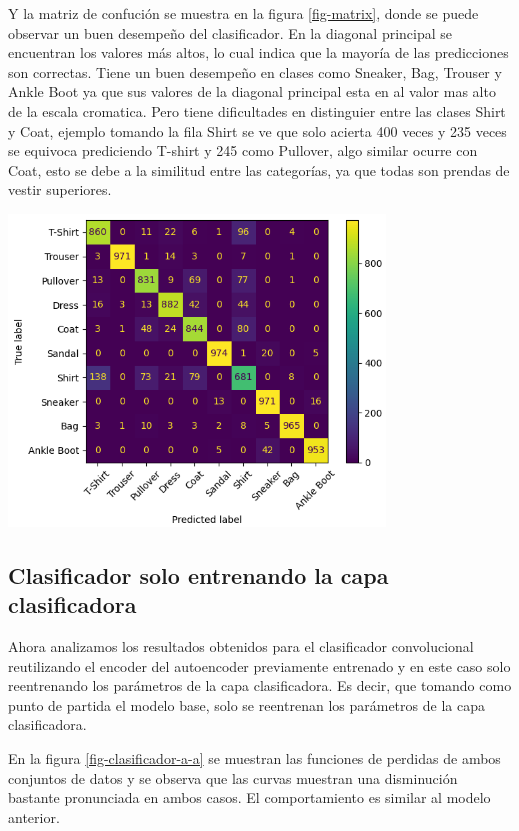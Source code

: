 \documentclass[aps,prl,reprint,groupedaddress]{revtex4-2}
\newenvironment{Figura}
  {\par\medskip\noindent\minipage{\linewidth}}
  {\endminipage\par\medskip}
\begin{document}
Y la matriz de confución se muestra en la figura \ref{fig-matrix}, donde se 
puede observar un buen desempeño del clasificador. En la diagonal principal se
encuentran los valores más altos, lo cual indica que la mayoría de las
predicciones son correctas. Tiene un buen desempeño en clases como Sneaker, 
Bag, Trouser y Ankle Boot ya que sus valores de la diagonal principal esta 
en al valor mas alto de la escala cromatica. Pero tiene dificultades en 
distinguier entre las clases Shirt y Coat, ejemplo tomando la fila Shirt se ve 
que solo acierta 400 veces y 235 veces se equivoca prediciendo T-shirt y 245
como Pullover, algo similar ocurre con Coat, esto se debe a la similitud entre 
las categorías, ya que todas son prendas de vestir superiores.

\begin{Figura}
  \centering
  \includegraphics[width=0.75\textwidth]{figs/matrix_confuncion_modelo_con_clasificador.png}
  \label{fig-matrix}
\end{Figura}

\subsection{Clasificador solo entrenando la capa clasificadora}

Ahora analizamos los resultados obtenidos para el clasificador convolucional
reutilizando el encoder del autoencoder previamente entrenado y en este caso
solo reentrenando los parámetros de la capa clasificadora. Es decir, que 
tomando como punto de partida el modelo base, solo se reentrenan los parámetros
de la capa clasificadora.

En la figura \ref{fig-clasificador-a-a} se muestran las funciones de perdidas 
de ambos conjuntos de datos y se observa que las curvas muestran una disminución
bastante pronunciada en ambos casos. El comportamiento es similar al modelo
anterior.
\end{document}

